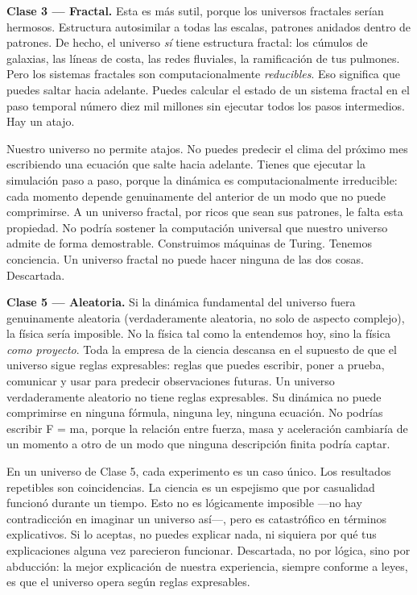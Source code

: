 \documentclass[11pt, twoside, openright]{book}
\begin{document}
\textbf{Clase 3 --- Fractal.} Esta es más sutil, porque los universos fractales serían hermosos. Estructura autosimilar a todas las escalas, patrones anidados dentro de patrones. De hecho, el universo \textit{sí} tiene estructura fractal: los cúmulos de galaxias, las líneas de costa, las redes fluviales, la ramificación de tus pulmones. Pero los sistemas fractales son computacionalmente \textit{reducibles}. Eso significa que puedes saltar hacia adelante. Puedes calcular el estado de un sistema fractal en el paso temporal número diez mil millones sin ejecutar todos los pasos intermedios. Hay un atajo.

Nuestro universo no permite atajos. No puedes predecir el clima del próximo mes escribiendo una ecuación que salte hacia adelante. Tienes que ejecutar la simulación paso a paso, porque la dinámica es computacionalmente irreducible: cada momento depende genuinamente del anterior de un modo que no puede comprimirse. A un universo fractal, por ricos que sean sus patrones, le falta esta propiedad. No podría sostener la computación universal que nuestro universo admite de forma demostrable. Construimos máquinas de Turing. Tenemos conciencia. Un universo fractal no puede hacer ninguna de las dos cosas. Descartada.

\textbf{Clase 5 --- Aleatoria.} Si la dinámica fundamental del universo fuera genuinamente aleatoria (verdaderamente aleatoria, no solo de aspecto complejo), la física sería imposible. No la física tal como la entendemos hoy, sino la física \textit{como proyecto}. Toda la empresa de la ciencia descansa en el supuesto de que el universo sigue reglas expresables: reglas que puedes escribir, poner a prueba, comunicar y usar para predecir observaciones futuras. Un universo verdaderamente aleatorio no tiene reglas expresables. Su dinámica no puede comprimirse en ninguna fórmula, ninguna ley, ninguna ecuación. No podrías escribir F = ma, porque la relación entre fuerza, masa y aceleración cambiaría de un momento a otro de un modo que ninguna descripción finita podría captar.

En un universo de Clase 5, cada experimento es un caso único. Los resultados repetibles son coincidencias. La ciencia es un espejismo que por casualidad funcionó durante un tiempo. Esto no es lógicamente imposible ---no hay contradicción en imaginar un universo así---, pero es catastrófico en términos explicativos. Si lo aceptas, no puedes explicar nada, ni siquiera por qué tus explicaciones alguna vez parecieron funcionar. Descartada, no por lógica, sino por abducción: la mejor explicación de nuestra experiencia, siempre conforme a leyes, es que el universo opera según reglas expresables.
\end{document}
